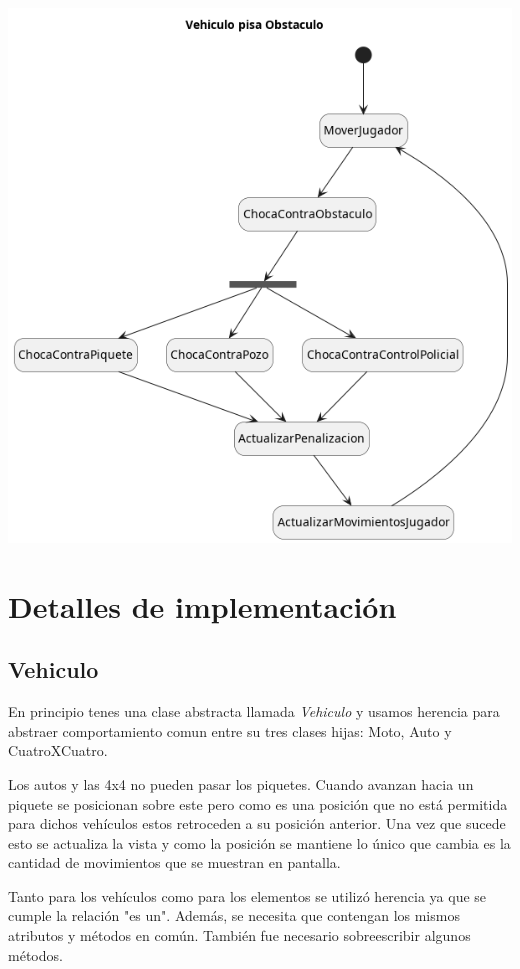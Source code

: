 \documentclass[titlepage,a4paper]{article}
\begin{document}
\begin{center}
\includegraphics[width=.9\linewidth]{./diagramas/estado-vehiculo-obstaculo.png}
\end{center}

\section{Detalles de implementación}
\label{sec:org3b48509}
\subsection{Vehiculo}
\label{sec:orga2c3b93}

En principio tenes una clase abstracta llamada \emph{Vehiculo} y usamos herencia para
abstraer comportamiento comun entre su tres clases hijas: Moto, Auto y CuatroXCuatro.

Los autos y las 4x4 no pueden pasar los piquetes. Cuando avanzan hacia
un piquete se posicionan sobre este pero como es una posición que no
está permitida para dichos vehículos estos retroceden a su posición
anterior. Una vez que sucede esto se actualiza la vista y como la
posición se mantiene lo único que cambia es la cantidad de movimientos
que se muestran en pantalla.

Tanto para los vehículos como para los elementos se utilizó herencia
ya que se cumple la relación "es un". Además, se necesita que
contengan los mismos atributos y métodos en común. También fue
necesario sobreescribir algunos métodos.
\end{document}
